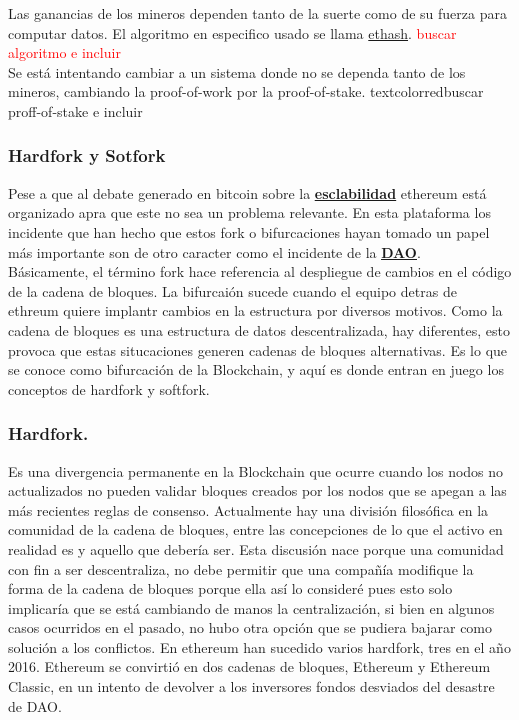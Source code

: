 \documentclass[11pt,a4paper]{article}
\begin{document}
Las ganancias de los mineros dependen tanto de la suerte como de su fuerza para computar datos. El algoritmo en especifico usado se llama \underline{ethash}. \textcolor{red}{buscar algoritmo e incluir}\\

Se está intentando cambiar a un sistema donde no se dependa tanto de los mineros, cambiando la proof-of-work por la proof-of-stake.
textcolor{red}{buscar proff-of-stake e incluir}\\

\subsubsection{Hardfork y Sotfork}
Pese a que al debate generado en bitcoin sobre la \hyperref[sec:escalabilidad]{\textbf{\underline{esclabilidad}}} ethereum está organizado apra que este no sea un problema relevante. En esta plataforma los incidente que han hecho que estos fork o bifurcaciones hayan tomado un papel más importante son de otro caracter como el incidente de la \hyperref[sec:dao]{\textbf{\underline{DAO}}}.\\

Básicamente, el término fork hace referencia al despliegue de cambios en el código de la cadena de bloques. La bifurcaión sucede cuando el equipo detras de ethreum quiere implantr cambios en la estructura por diversos motivos. Como la cadena de bloques es una estructura de datos descentralizada, hay diferentes, esto provoca que estas situcaciones generen cadenas de bloques alternativas. Es lo que se conoce como bifurcación de la Blockchain, y aquí es donde entran en juego los conceptos de hardfork y softfork.\\

\subsubsection{Hardfork.}
\label{sec:hardfork}
Es una divergencia permanente en la Blockchain que ocurre cuando los nodos no actualizados no pueden validar bloques creados por los nodos que se apegan a las más recientes reglas de consenso. Actualmente hay una división filosófica en la comunidad  de la cadena de bloques, entre las concepciones de lo que el activo en realidad es y aquello que debería ser. Esta discusión nace porque una comunidad con fin a ser descentraliza, no debe permitir que una compañía modifique la forma de la cadena de bloques porque ella así lo consideré pues esto solo implicaría que se está cambiando de manos la centralización, si bien en algunos casos ocurridos en el pasado, no hubo otra opción que se pudiera bajarar como solución a los conflictos. En ethereum han sucedido varios hardfork, tres en el año 2016. Ethereum se convirtió en dos cadenas de bloques, Ethereum y Ethereum Classic, en un intento de devolver a los inversores fondos desviados del desastre de DAO.
\end{document}
